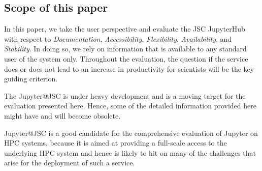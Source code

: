 \subsection{Scope of this paper}

In this paper, we take the user perspective and evaluate the JSC JupyterHub with respect to {\em Documentation}, {\em Accessibility}, {\em Flexibility}, {\em Availability}, and {\em Stability}.
In doing so, we rely on information that is available to any standard user of the system only.
Throughout the evaluation, the question if the service does or does not lead to an increase in productivity for scientists will be the key guiding criterion.

The Jupyter@JSC is under heavy development and is a moving target for the evaluation presented here.
Hence, some of the detailed information provided here might have and will become obsolete.

Jupyter@JSC is a good candidate for the comprehensive evaluation of Jupyter on HPC systems, because it is aimed at providing a full-scale access to the underlying HPC system and hence is likely to hit on many of the challenges that arise for the deployment of such a service. 
